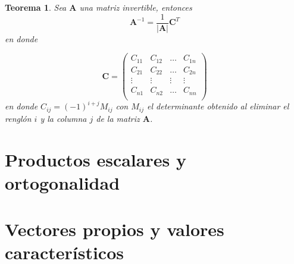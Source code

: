 \documentclass[11pt]{report}
\theoremstyle{break}
\newtheorem{teorema}{Teorema}[chapter]
\theoremstyle{break}
\begin{document}
\begin{teorema}
Sea $\bm{A}$ una matriz invertible, entonces
$$
\bm{A}^{-1} = \dfrac{1}{|\bm{A}|} \bm{C}^{T}
$$
en donde 

$$
\bm{C} =
\begin{pmatrix}
C_{11} & C_{12} & \ldots & C_{1n} \\
C_{21} & C_{22} & \ldots & C_{2n} \\
\vdots & \vdots & \vdots & \vdots \\
C_{n1} & C_{n2} & \ldots & C_{nn} \\
\end{pmatrix}
$$
en donde $C_{ij} = (-1)^{i + j}M_{ij}$ con $M_{ij}$ el determinante obtenido al eliminar el renglón $i$ y la columna $j$ de la matriz $\bm{A}$.
\end{teorema}

\chapter{Productos escalares y ortogonalidad}
\label{capitulo:productos-escalares}

\chapter{Vectores propios y valores característicos}
\label{chapter:eigen}
\end{document}
